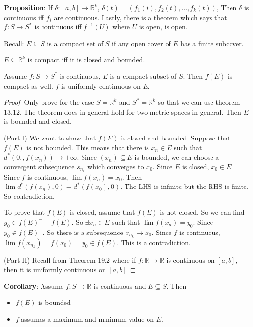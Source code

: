 \documentclass{report}
\begin{document}
\textbf{Proposition}: If $\delta: [a, b] \rightarrow \mathbb{R}^{k}$, $\delta(t) = (f_{1}(t), f_{2}(t), \ldots , f_{k}(t))$, Then $\delta$ is continuous iff $f_{i}$ are continuous. Lastly, there is a theorem which says that $f : S \rightarrow S^{*}$ is continuous iff $f^{-1}(U)$ where $U$ is open, is open.

Recall: $E \subseteq S$ is a compact set of $S$ if any open cover of $E$ has a finite subcover.

\begin{theorem}{13.12}
    $E \subseteq \mathbb{R}^{k}$ is compact iff it is closed and bounded.
\end{theorem}

\begin{theorem}{21.4}
    Assume $f: S \rightarrow S^{*}$ is continuous, $E$ is a compact subset of $S$. Then $f(E)$ is compact as well. $f$ is uniformly continuous on $E$.
\end{theorem}
    \begin{proof}
        Only prove for the case $S = \mathbb{R}^{k}$ and $S^{*} = \mathbb{R}^{k}$ so that we can use theorem $13.12$. The theorem does in general hold for two metric spaces in general. Then $E$ is bounded and closed.

        (Part I) We want to show that $f(E)$ is closed and bounded. Suppose that $f(E)$ is not bounded. This means that there is $x_{n} \in E$ such that $d^{*}(0,, f(x_{n}))  \rightarrow +\infty $. Since $(x_{n}) \subseteq E$ is bounded, we can choose a convergent subsequence $s_{n_{k}}$ which converges to $x_{0}$. Since $E$ is closed, $x_{0} \in E$. Since $f$ is continuous, $\lim f(x_{n}) = x_{0}$. Then $\lim d^{*}(f(x_{n}), 0) = d^{*}(f(x_{0}), 0)$. The LHS is infinite but the RHS is finite. So contradiction.

        To prove that $f(E)$ is closed, assume that $f(E)$ is not closed. So we can find $y_{0} \in f(E)^{-} - f(E)$. So $\exists x_{n} \in E$ such that $\lim f(x_{n}) = y_{0}$. Since $y_{0} \in f(E)^{-}$. So there is a subsequence $x_{n_{k}} \rightarrow x_{0}$. Since $f$ is continuous, $\lim f(x_{n_{k}}) = f(x_{0}) = y_{0} \in f(E)$. This is a contradiction.

        (Part II) Recall from Theorem $19.2$ where if $f : \mathbb{R} \rightarrow \mathbb{R}$ is continuous on $[a, b]$, then it is uniformly continuous on $[a, b]$
    \end{proof}

\textbf{Corollary}: Assume $f: S \rightarrow \mathbb{R}$ is continuous and $E \subseteq S$. Then
    \begin{itemize}
        \item  $f(E)$ is bounded

        \item  $f$ assumes a maximum and minimum value on $E$. 
    \end{itemize}
\end{document}
